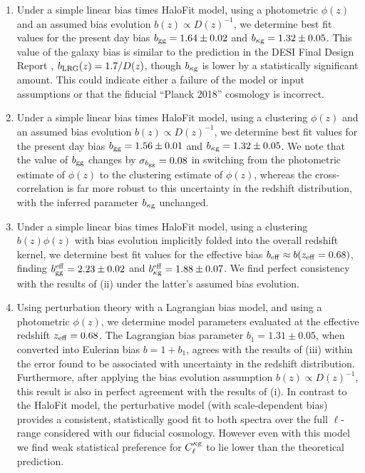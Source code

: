 \documentclass[a4paper,usenatbib]{mnras}
\begin{document}
\begin{enumerate}

    \item Under a simple linear bias times HaloFit model, using a photometric $\phi(z)$ and an assumed bias evolution $b(z) \propto D(z)^{-1}$, we determine best fit values for the present day bias $b_{\rm gg} = 1.64 \pm 0.02$ and $b_{\rm \kappa g} = 1.32 \pm 0.05$. This value of the galaxy bias is similar to the prediction in the DESI Final Design Report \citep{DESI16}, $b_{\rm LRG}(z) = 1.7/D(z)$, though $b_{\rm \kappa g}$ is lower by a statistically significant amount.  This could indicate either a failure of the model or input assumptions or that the fiducial ``Planck 2018'' cosmology is incorrect.
    
    \item Under a simple linear bias times HaloFit model, using a clustering $\phi(z)$ and an assumed bias evolution $b(z) \propto D(z)^{-1}$, we determine best fit values for the present day bias $b_{\rm gg} = 1.56 \pm 0.01$ and $b_{\rm \kappa g} = 1.32 \pm 0.05$. We note that the value of $b_{\rm gg}$ changes by $\sigma_{b_{\rm gg}} = 0.08$ in switching from the photometric estimate of $\phi(z)$ to the clustering estimate of $\phi(z)$, whereas the cross-correlation is far more robust to this uncertainty in the redshift distribution, with the inferred parameter $b_{\rm \kappa g}$ unchanged.
    
    \item Under a simple linear bias times HaloFit model, using a clustering $b(z)\phi(z)$ with bias evolution implicitly folded into the overall redshift kernel, we determine best fit values for the effective bias $b_{\rm eff} \approx b(z_{\rm eff} = 0.68)$, finding $b^{\rm eff}_{\rm gg} = 2.23 \pm 0.02$ and $b^{\rm eff}_{\rm \kappa g} = 1.88 \pm 0.07$. We find perfect consistency with the results of (ii) under the latter's assumed bias evolution.
    
    \item Using perturbation theory with a Lagrangian bias model, and using a photometric $\phi(z)$, we determine model parameters evaluated at the effective redshift $z_{\rm eff} = 0.68$. The Lagrangian bias parameter $b_1 = 1.31 \pm 0.05$, when converted into Eulerian bias $b = 1 + b_{1}$, agrees with the results of (iii) within the error found to be associated with uncertainty in the redshift distribution. Furthermore, after applying the bias evolution assumption $b(z) \propto D(z)^{-1}$, this result is also in perfect agreement with the results of (i).  In contrast to the HaloFit model, the perturbative model (with scale-dependent bias) provides a consistent, statistically good fit to both spectra over the full $\ell$-range considered with our fiducial cosmology.  However even with this model we find weak statistical preference for $C_\ell^{\rm \kappa g}$ to lie lower than the theoretical prediction.
    
\end{enumerate}
\end{document}
